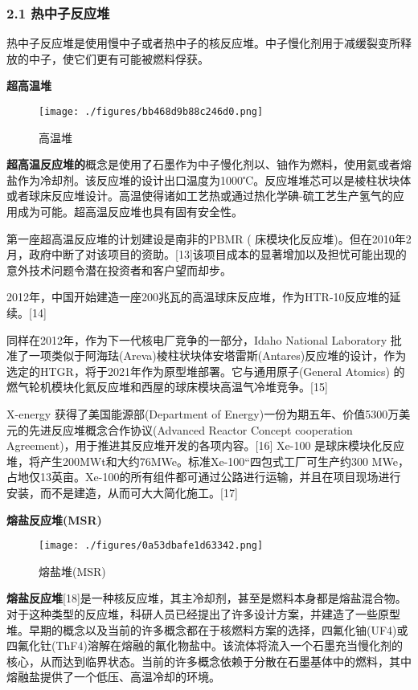 \subsubsection{2.1 热中子反应堆}
热中子反应堆是使用慢中子或者热中子的核反应堆。中子慢化剂用于减缓裂变所释放的中子，使它们更有可能被燃料俘获。

\textbf{超高温堆}

\begin{figure}[ht]
\centering
\texttt{[image: ./figures/bb468d9b88c246d0.png]}
\caption{高温堆} \label{fig_FYD_1}
\end{figure}

\textbf{超高温反应堆的}概念是使用了石墨作为中子慢化剂以、铀作为燃料，使用氦或者熔盐作为冷却剂。该反应堆的设计出口温度为1000℃。反应堆堆芯可以是棱柱状块体或者球床反应堆设计。高温使得诸如工艺热或通过热化学碘-硫工艺生产氢气的应用成为可能。超高温反应堆也具有固有安全性。

第一座超高温反应堆的计划建设是南非的PBMR ( 床模块化反应堆)。但在2010年2月，政府中断了对该项目的资助。[13]该项目成本的显著增加以及担忧可能出现的意外技术问题令潜在投资者和客户望而却步。

2012年，中国开始建造一座200兆瓦的高温球床反应堆，作为HTR-10反应堆的延续。[14]

同样在2012年，作为下一代核电厂竞争的一部分，Idaho National Laboratory 批准了一项类似于阿海珐(Areva)棱柱状块体安塔雷斯(Antares)反应堆的设计，作为选定的HTGR，将于2021年作为原型堆部署。它与通用原子(General Atomics) 的燃气轮机模块化氦反应堆和西屋的球床模块高温气冷堆竞争。[15]

X-energy 获得了美国能源部(Department of Energy)一份为期五年、价值5300万美元的先进反应堆概念合作协议(Advanced Reactor Concept cooperation Agreement)，用于推进其反应堆开发的各项内容。[16] Xe-100 是球床模块化反应堆，将产生200MWt和大约76MWe。标准Xe-100“四包式工厂可生产约300 MWe，占地仅13英亩。Xe-100的所有组件都可通过公路进行运输，并且在项目现场进行安装，而不是建造，从而可大大简化施工。[17]

\textbf{熔盐反应堆(MSR)}

\begin{figure}[ht]
\centering
\texttt{[image: ./figures/0a53dbafe1d63342.png]}
\caption{熔盐堆(MSR)} \label{fig_FYD_2}
\end{figure}

\textbf{熔盐反应堆}[18]是一种核反应堆，其主冷却剂，甚至是燃料本身都是熔盐混合物。对于这种类型的反应堆，科研人员已经提出了许多设计方案，并建造了一些原型堆。早期的概念以及当前的许多概念都在于核燃料方案的选择，四氟化铀(UF4)或四氟化钍(ThF4)溶解在熔融的氟化物盐中。该流体将流入一个石墨充当慢化剂的核心，从而达到临界状态。当前的许多概念依赖于分散在石墨基体中的燃料，其中熔融盐提供了一个低压、高温冷却的环境。

